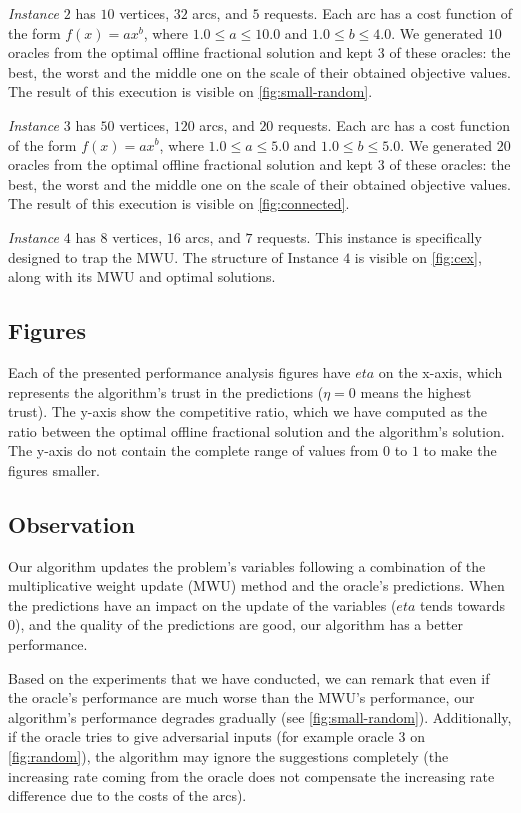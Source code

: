\textit{Instance $2$} has $10$ vertices, $32$ arcs, and $5$ requests. Each arc has a cost function of the form $f(x) = a x^b$, where $1.0 \le a \le 10.0$ and $1.0 \le b \le 4.0$. We generated $10$ oracles from the optimal offline fractional solution and kept $3$ of these oracles: the best, the worst and the middle one on the scale of their obtained objective values. The result of this execution is visible on \cref{fig:small-random}.

\textit{Instance $3$} has $50$ vertices, $120$ arcs, and $20$ requests. Each arc has a cost function of the form $f(x) = a x^b$, where $1.0 \le a \le 5.0$ and $1.0 \le b \le 5.0$. We generated $20$ oracles from the optimal offline fractional solution and kept $3$ of these oracles: the best, the worst and the middle one on the scale of their obtained objective values. The result of this execution is visible on \cref{fig:connected}.

\textit{Instance $4$} has $8$ vertices, $16$ arcs, and $7$ requests. This instance is specifically designed to trap the MWU. The structure of Instance $4$ is visible on \cref{fig:cex}, along with its MWU and optimal solutions.


\subsection{Figures} Each of the presented performance analysis figures have $eta$ on the x-axis, which represents the algorithm's trust in the predictions ($\eta = 0$ means the highest trust). The y-axis show the competitive ratio, which we have computed as the ratio between the optimal offline fractional solution and the algorithm's solution. The y-axis do not contain the complete range of values from $0$ to $1$ to make the figures smaller.

\subsection{Observation} Our algorithm updates the problem's variables following a combination of the multiplicative weight update (MWU) method and the oracle's predictions. When the predictions have an impact on the update of the variables ($eta$ tends towards $0$), and the quality of the predictions are good, our algorithm has a better performance.

Based on the experiments that we have conducted, we can remark that even if the oracle's performance are much worse than the MWU's performance, our algorithm's performance degrades gradually (see \cref{fig:small-random}). Additionally, if the oracle tries to give adversarial inputs (for example oracle $3$ on \cref{fig:random}), the algorithm may ignore the suggestions completely (the increasing rate coming from the oracle does not compensate the increasing rate difference due to the costs of the arcs).

